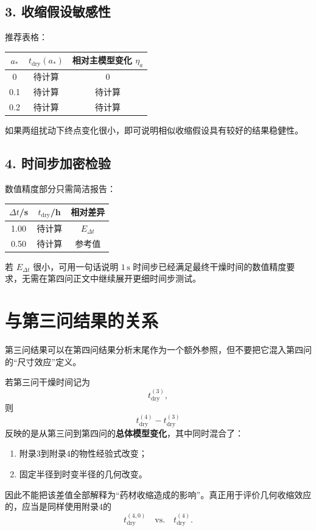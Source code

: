 \documentclass[UTF8,a4paper,12pt]{ctexart}
\begin{document}
\subsection*{3. 收缩假设敏感性}
推荐表格：
\begin{center}
\begin{tabular}{ccc}
\toprule
$a_*$ & $t_{\mathrm{dry}}(a_*)$ & 相对主模型变化 $\eta_a$ \\
\midrule
0 & 待计算 & 0 \\
0.1 & 待计算 & 待计算 \\
0.2 & 待计算 & 待计算 \\
\bottomrule
\end{tabular}
\end{center}
如果两组扰动下终点变化很小，即可说明相似收缩假设具有较好的结果稳健性。

\subsection*{4. 时间步加密检验}
数值精度部分只需简洁报告：
\begin{center}
\begin{tabular}{ccc}
\toprule
$\Delta t$/s & $t_{\mathrm{dry}}$/h & 相对差异 \\
\midrule
1.00 & 待计算 & $E_{\Delta t}$ \\
0.50 & 待计算 & 参考值 \\
\bottomrule
\end{tabular}
\end{center}
若 $E_{\Delta t}$ 很小，可用一句话说明 $1\,\mathrm{s}$ 时间步已经满足最终干燥时间的数值精度要求，无需在第四问正文中继续展开更细时间步测试。

\section{与第三问结果的关系}

第三问结果可以在第四问结果分析末尾作为一个额外参照，但不要把它混入第四问的“尺寸效应”定义。

若第三问干燥时间记为
\[
t_{\mathrm{dry}}^{(3)},
\]
则
\[
t_{\mathrm{dry}}^{(4)}-t_{\mathrm{dry}}^{(3)}
\]
反映的是从第三问到第四问的\textbf{总体模型变化}，其中同时混合了：
\begin{enumerate}[label=(\arabic*)]
    \item 附录3到附录4的物性经验式改变；
    \item 固定半径到时变半径的几何改变。
\end{enumerate}
因此不能把该差值全部解释为“药材收缩造成的影响”。真正用于评价几何收缩效应的，应当是同样使用附录4的
\[
\boxed{
t_{\mathrm{dry}}^{(4,0)}
\quad\text{vs.}\quad
t_{\mathrm{dry}}^{(4)}.
}
\]
\end{document}
